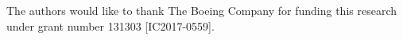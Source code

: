 The authors would like to thank The Boeing Company for funding this research under grant number 131303 [IC2017-0559].